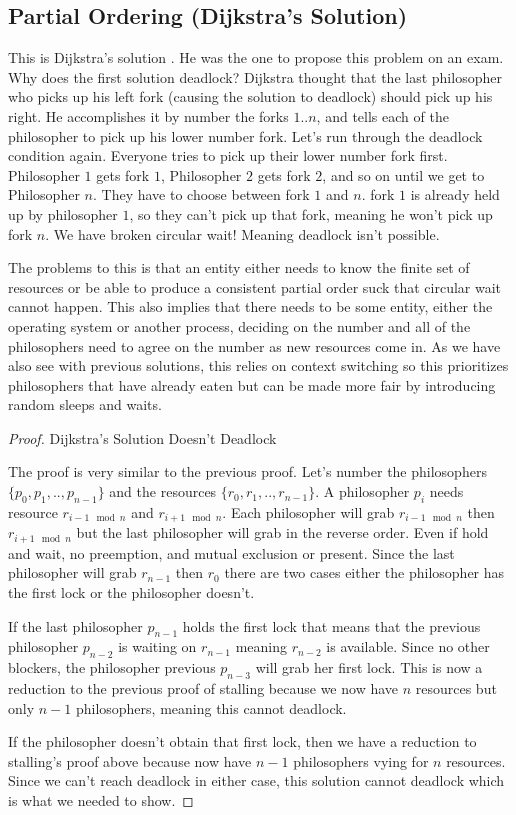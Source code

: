 \subsection{Partial Ordering (Dijkstra's Solution)}

This is Dijkstra's solution \cite[P. 20]{EWD:EWD310}. He was the one to propose this problem on an exam.
Why does the first solution deadlock? Dijkstra thought that the last philosopher who picks up his left fork (causing the solution to deadlock) should pick up his right.
He accomplishes it by number the forks $1..n$, and tells each of the philosopher to pick up his lower number fork.
Let's run through the deadlock condition again.
Everyone tries to pick up their lower number fork first.
Philosopher $1$ gets fork $1$, Philosopher $2$ gets fork $2$, and so on until we get to Philosopher $n$.
They have to choose between fork $1$ and $n$.
fork $1$ is already held up by philosopher $1$, so they can't pick up that fork, meaning he won't pick up fork $n$.
We have broken circular wait! Meaning deadlock isn't possible.

The problems to this is that an entity either needs to know the finite set of resources or be able to produce a consistent partial order suck that circular wait cannot happen.
This also implies that there needs to be some entity, either the operating system or another process, deciding on the number and all of the philosophers need to agree on the number as new resources come in.
As we have also see with previous solutions, this relies on context switching so this prioritizes philosophers that have already eaten but can be made more fair by introducing random sleeps and waits.

\begin{proof} Dijkstra's Solution Doesn't Deadlock

The proof is very similar to the previous proof.
Let's number the philosophers $\{p_0, p_1, .., p_{n-1}\}$ and the resources $\{r_0, r_1, .., r_{n-1}\}$.
A philosopher $p_i$ needs resource $r_{i-1 \mod n}$ and $r_{i + 1 \mod n}$.
Each philosopher will grab $r_{i-1 \mod n}$ then $r_{i + 1 \mod n}$ but the last philosopher will grab in the reverse order.
Even if hold and wait, no preemption, and mutual exclusion or present.
Since the last philosopher will grab $r_{n-1}$ then $r_0$ there are two cases either the philosopher has the first lock or the philosopher doesn't.

If the last philosopher $p_{n-1}$ holds the first lock that means that the previous philosopher $p_{n-2}$ is waiting on $r_{n-1}$ meaning $r_{n-2}$ is available.
Since no other blockers, the philosopher previous $p_{n-3}$ will grab her first lock.
This is now a reduction to the previous proof of stalling because we now have $n$ resources but only $n-1$ philosophers, meaning this cannot deadlock.

If the philosopher doesn't obtain that first lock, then we have a reduction to stalling's proof above because now have $n-1$ philosophers vying for $n$ resources.
Since we can't reach deadlock in either case, this solution cannot deadlock which is what we needed to show.

\end{proof}

